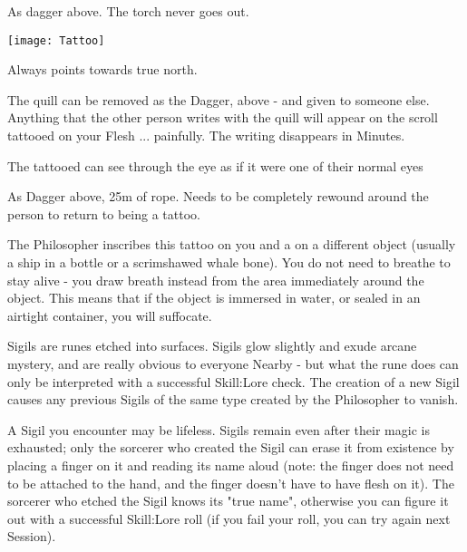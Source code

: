 
As dagger above.  The torch never goes out.

  \begin{center}
  \texttt{[image: Tattoo]}
  \end{center}



Always points towards true north.  


The quill can be removed as the Dagger, above - and given to someone else.  Anything that the other person writes with the quill will appear on the scroll tattooed on your Flesh ... painfully.  The writing disappears in Minutes.


The tattooed can see through the eye as if it were one of their normal eyes


As Dagger above, 25m of rope. Needs to be completely rewound around the person to return to being a tattoo.



The Philosopher inscribes this tattoo on you and a  on a different object (usually a ship in a bottle or a scrimshawed whale bone).  You do not need to breathe to stay alive - you draw breath instead from the area immediately around the object.  This means that if the object is immersed in water, or sealed in an airtight container, you will suffocate.


Sigils are runes etched into surfaces.  Sigils glow slightly and exude arcane mystery, and are really obvious to everyone Nearby - but what the rune does can only be interpreted with a successful Skill:Lore check.  The creation of a new Sigil causes any previous Sigils of the same type created by the Philosopher to vanish.

A Sigil you encounter may be lifeless.  Sigils remain even after their magic is exhausted; only the sorcerer who created the Sigil can erase it from existence by placing a finger on it and reading its name aloud (note: the finger does not need to be attached to the hand, and the finger doesn't have to have flesh on it).  The sorcerer who etched the Sigil knows its "true name", otherwise you can figure it out with a successful Skill:Lore roll (if you fail your roll, you can try again next Session).

